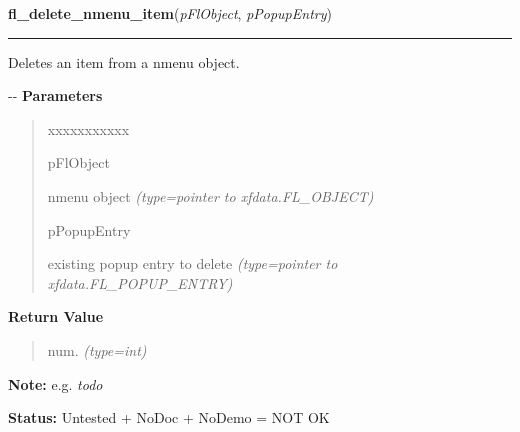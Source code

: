     \label{xformslib:flnmenu:fl_delete_nmenu_item}

    \vspace{0.5ex}

\hspace{.8\funcindent}\begin{boxedminipage}{\funcwidth}

    \raggedright \textbf{fl\_delete\_nmenu\_item}(\textit{pFlObject}, \textit{pPopupEntry})

    \vspace{-1.5ex}

    \rule{\textwidth}{0.5\fboxrule}
\setlength{\parskip}{2ex}

Deletes an item from a nmenu object.

-{}-
\setlength{\parskip}{1ex}
      \textbf{Parameters}
      \vspace{-1ex}

      \begin{quote}
        \begin{Ventry}{xxxxxxxxxxx}

          \item[pFlObject]


nmenu object
            {\it (type=pointer to xfdata.FL\_OBJECT)}

          \item[pPopupEntry]


existing popup entry to delete
            {\it (type=pointer to xfdata.FL\_POPUP\_ENTRY)}

        \end{Ventry}

      \end{quote}

      \textbf{Return Value}
    \vspace{-1ex}

      \begin{quote}

num.
      {\it (type=int)}

      \end{quote}

\textbf{Note:} 
e.g. \emph{todo}


\textbf{Status:} 
Untested + NoDoc + NoDemo = NOT OK


    \end{boxedminipage}

    \label{xformslib:flnmenu:fl_set_nmenu_items}

